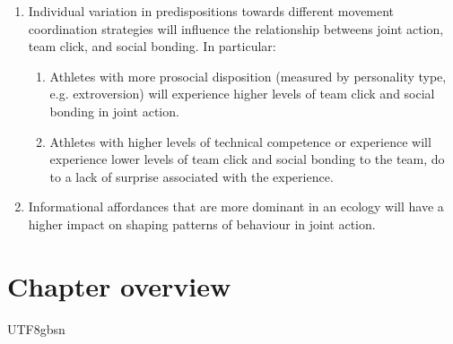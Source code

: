 \begin{CJK}{UTF8}{gbsn}
\begin{enumerate}
  \item Individual variation in predispositions towards different movement coordination strategies will influence the relationship betweens joint action, team click, and social bonding.  In particular:
      \begin{enumerate}
        \item Athletes with more prosocial disposition (measured by personality type, e.g. extroversion) will experience higher levels of team click and social bonding in joint action.
        \item Athletes with higher levels of technical competence or experience will experience lower levels of team click and social bonding to the team, do to a lack of surprise associated with the experience.
      \end{enumerate}

  \item Informational affordances that are more dominant in an ecology will have a higher impact on shaping patterns of behaviour in joint action.

\end{enumerate}








\section{Chapter overview}


                                              \end{CJK}{UTF8}{gbsn}
